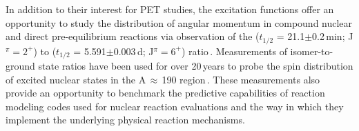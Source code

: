 


In addition to their interest for PET studies, the  excitation functions 
offer an opportunity to study the distribution of angular momentum in compound nuclear and direct pre-equilibrium reactions via observation of the  ($t_{1/2}$ = 21.1$\pm$0.2\,min; J$^\pi=2^+$) to  ($t_{1/2}$ = 5.591$\pm$0.003\,d; J$^\pi=6^+$)   ratio\,\cite{Dong2015,Wang2017}.
Measurements of isomer-to-ground state ratios have been used for over 20\,years to probe the spin distribution of excited nuclear states in the A\,$\approx$\,190 region\,\cite{PhysRevC.73.034613,PhysRevC.45.1171}.
These measurements also provide an opportunity to benchmark 
the predictive capabilities of  reaction modeling codes used for nuclear reaction evaluations and the way in which they implement the underlying physical reaction mechanisms.  






